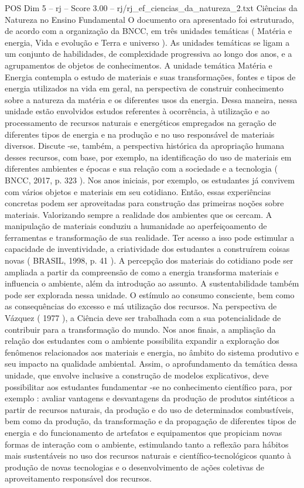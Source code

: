 \begin{textsample}{POS Dim 5 – rj – Score 3.00 – rj/rj\_ef\_ciencias\_da\_natureza\_2.txt}  \label{ex:f5_pos_198}
Ciências da Natureza no Ensino Fundamental O documento ora apresentado foi estruturado, de acordo com a organização da BNCC, em três unidades temáticas ( Matéria e energia, Vida e evolução e Terra e universo ).
As unidades temáticas se ligam a um conjunto de habilidades, de complexidade progressiva ao longo dos anos, e a agrupamentos de objetos de conhecimentos.
A unidade temática Matéria e Energia contempla o estudo de materiais e suas transformações, fontes e tipos de energia utilizados na vida em geral, na perspectiva de construir conhecimento sobre a natureza da matéria e os diferentes usos da energia.
Dessa maneira, nessa unidade estão envolvidos estudos referentes à ocorrência, à utilização e ao processamento de recursos naturais e energéticos empregados na geração de diferentes tipos de energia e na produção e no uso responsável de materiais diversos.
Discute -se, também, a perspectiva histórica da apropriação humana desses recursos, com base, por exemplo, na identificação do uso de materiais em diferentes ambientes e épocas e sua relação com a sociedade e a tecnologia ( BNCC, 2017, p. 323 ).
Nos anos iniciais, por exemplo, os estudantes já convivem com vários objetos e materiais em seu cotidiano.
Então, essas experiências concretas podem ser aproveitadas para construção das primeiras noções sobre materiais.
Valorizando sempre a realidade dos ambientes que os cercam.
A manipulação de materiais conduziu a humanidade ao aperfeiçoamento de ferramentas e transformação de sua realidade.
Ter acesso a isso pode estimular a capacidade de inventividade, a criatividade dos estudantes a construírem coisas novas ( BRASIL, 1998, p. 41 ).
A percepção dos materiais do cotidiano pode ser ampliada a partir da compreensão de como a energia transforma materiais e influencia o ambiente, além da introdução ao assunto.
A sustentabilidade também pode ser explorada nessa unidade.
O estímulo ao consumo consciente, bem como as consequências do excesso e má utilização dos recursos.
Na perspectiva de Vázquez ( 1977 ), a Ciência deve ser trabalhada com a sua potencialidade de contribuir para a transformação do mundo.
Nos anos finais, a ampliação da relação dos estudantes com o ambiente possibilita expandir a exploração dos fenômenos relacionados aos materiais e energia, no âmbito do sistema produtivo e seu impacto na qualidade ambiental.
Assim, o aprofundamento da temática dessa unidade, que envolve inclusive a construção de modelos explicativos, deve possibilitar aos estudantes fundamentar -se no conhecimento científico para, por exemplo : avaliar vantagens e desvantagens da produção de produtos sintéticos a partir de recursos naturais, da produção e do uso de determinados combustíveis, bem como da produção, da transformação e da propagação de diferentes tipos de energia e do funcionamento de artefatos e equipamentos que propiciam novas formas de interação com o ambiente, estimulando tanto a reflexão para hábitos mais sustentáveis no uso dos recursos naturais e científico-tecnológicos quanto à produção de novas tecnologias e o desenvolvimento de ações coletivas de aproveitamento responsável dos recursos.

\end{textsample}
